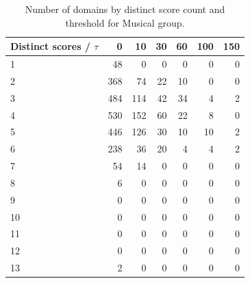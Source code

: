 \begin{table}[htbp]
\centering
\small
\begin{tabular}{l r r r r r r}
\hline
Distinct scores / $\tau$ & 0 & 10 & 30 & 60 & 100 & 150 \\
\hline
1 & 48 & 0 & 0 & 0 & 0 & 0 \\
2 & 368 & 74 & 22 & 10 & 0 & 0 \\
3 & 484 & 114 & 42 & 34 & 4 & 2 \\
4 & 530 & 152 & 60 & 22 & 8 & 0 \\
5 & 446 & 126 & 30 & 10 & 10 & 2 \\
6 & 238 & 36 & 20 & 4 & 4 & 2 \\
7 & 54 & 14 & 0 & 0 & 0 & 0 \\
8 & 6 & 0 & 0 & 0 & 0 & 0 \\
9 & 0 & 0 & 0 & 0 & 0 & 0 \\
10 & 0 & 0 & 0 & 0 & 0 & 0 \\
11 & 0 & 0 & 0 & 0 & 0 & 0 \\
12 & 0 & 0 & 0 & 0 & 0 & 0 \\
13 & 2 & 0 & 0 & 0 & 0 & 0 \\
\hline
\end{tabular}
\caption{Number of domains by distinct score count and threshold for Musical group.}
\label{tab:distinct-scores-Musical-group}
\end{table}
